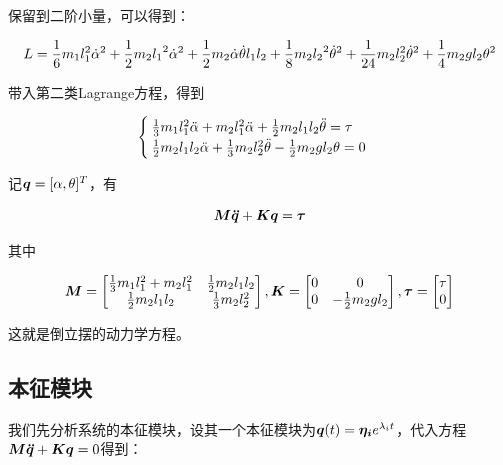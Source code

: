 \documentclass[UTF8]{ctexart}
\begin{document}
保留到二阶小量，可以得到：

\begin{equation}
    L = \frac{1}{6} m_1 l_1^2 {\dot{\alpha}}^2
    + \frac{1}{2} m_2 {l_1}^2 {\dot{\alpha}}^2
    + \frac{1}{2} m_2 \dot{\alpha} \dot{\theta} l_1 l_2
    + \frac{1}{8} m_2 {l_2}^2 {\dot{\theta}}^2
    + \frac{1}{24} m_2 l_2^2 {\dot{\theta}}^2
    + \frac{1}{4} m_2 g l_2\theta^2
\end{equation}

带入第二类Lagrange方程，得到

\begin{equation}
    \begin{cases}
        \frac{1}{3} m_1 l_1^2 \ddot{\alpha} + m_2 l_1^2 \ddot{\alpha} + \frac{1}{2} m_2 l_1 l_2 \ddot{\theta} = \tau\\
        \frac{1}{2} m_2 l_1 l_2 \ddot{\alpha} + \frac{1}{3} m_2 l_2^2 \ddot{\theta} - \frac{1}{2} m_2 g l_2 \theta = 0
    \end{cases}
\end{equation}

记$\boldsymbol{q}=[\alpha , \theta]^T$，有

\begin{equation}
    \boldsymbol{M} \boldsymbol{\ddot{q}} + \boldsymbol{K} \boldsymbol{q} = \boldsymbol{\tau}
\end{equation}

其中

\begin{equation}
    \boldsymbol{M} = \begin{bmatrix}
        \frac{1}{3} m_1 l_1^2 + m_2 l_1^2 & \frac{1}{2} m_2 l_1 l_2\\
        \frac{1}{2} m_2 l_1 l_2  & \frac{1}{3} m_2 l_2^2
    \end{bmatrix},
    \boldsymbol{K} = \begin{bmatrix}
        0 & 0\\
        0 & -\frac{1}{2} m_2 g l_2
    \end{bmatrix},
    \boldsymbol{\tau} = \begin{bmatrix}
        \tau\\
        0
    \end{bmatrix}
\end{equation}

这就是倒立摆的动力学方程。

\subsection{本征模块}

我们先分析系统的本征模块，设其一个本征模块为$\boldsymbol{q}(t) = \boldsymbol{\eta_i} e^{\lambda_i t}$，代入方程$\boldsymbol{M} \boldsymbol{\ddot{q}} + \boldsymbol{K} \boldsymbol{q} = 0$得到：
\end{document}
